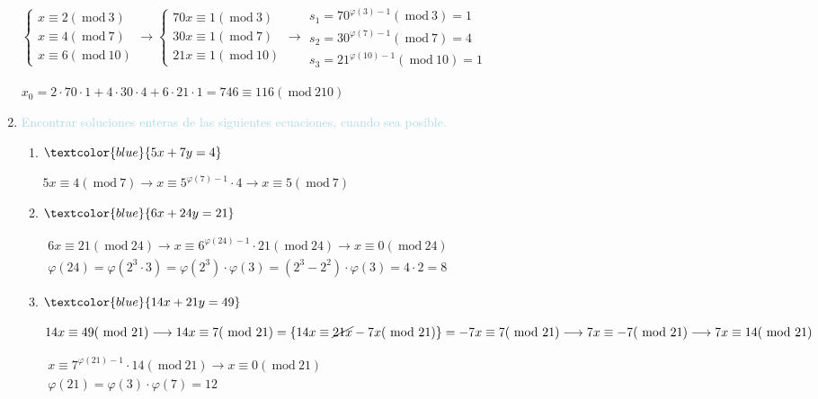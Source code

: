 \documentclass{article}
\newcommand{\lb}[1]{\textcolor{lightblue}{#1}}
\newcommand{\db}[1]{\textcolor{blue}{#1}}
\renewcommand{\mod}{~\mathrm{mod}~}
\begin{document}
\begin{enumerate}[label=\color{red}\textbf{\arabic*)}, leftmargin=*]
        $\begin{cases}
        x\equiv2(\mod3)\\
        x\equiv4(\mod7)\\
        x\equiv6(\mod10)
        \end{cases}\longrightarrow\begin{cases}
        70x\equiv1(\mod3)\\
        30x\equiv1(\mod7)\\
        21x\equiv1(\mod10)
        \end{cases}\longrightarrow\begin{array}{l}
        s_1=70^{\varphi(3)-1}(\mod3)=1\\
        s_2=30^{\varphi(7)-1}(\mod 7)=4\\
        s_3=21^{\varphi(10)-1}(\mod10)=1
        \end{array}$
        
        $x_0=2\cdot70\cdot1+4\cdot30\cdot4+6\cdot21\cdot1=746\equiv116(\mod210)$
	\item \lb{Encontrar soluciones enteras de las siguientes ecuaciones, cuando sea posible.}
	\begin{enumerate}[label=\color{red}\alph*)]
		\item $\db{5x+7y=4}$
        
        $5x\equiv4(\mod7)\longrightarrow x\equiv5^{\varphi(7)-1}\cdot4\longrightarrow x\equiv5(\mod7)$
		\item $\db{6x+24y=21}$
        
        $\begin{array}{l}
        6x\equiv21(\mod24)\longrightarrow x\equiv6^{\varphi(24)-1}\cdot21(\mod24)\longrightarrow x\equiv 0(\mod24)\\
        \varphi(24)=\varphi(2^3\cdot3)=\varphi(2^3)\cdot\varphi(3)=(2^3-2^2)\cdot\varphi(3)=4\cdot2=8
        \end{array}$
		\item $\db{14x+21y=49}$
        
        $14x\equiv49(\mod21)\longrightarrow14x\equiv7(\mod21)=\left\{14x\equiv\cancel{21x}-7x(\mod21)\right\}=-7x\equiv7(\mod21)\longrightarrow7x\equiv-7(\mod21)\longrightarrow7x\equiv14(\mod21)$
        
        $\begin{array}{l}
        x\equiv7^{\varphi(21)-1}\cdot14(\mod21)\longrightarrow x\equiv0(\mod21)\\
        \varphi(21)=\varphi(3)\cdot\varphi(7)=12
        \end{array}$
        

\end{enumerate}
\end{enumerate}
\end{document}
